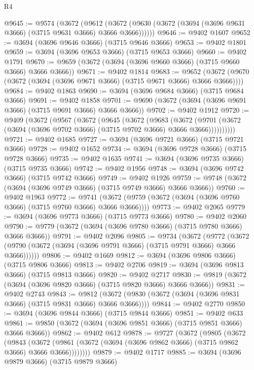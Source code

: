 \begin{lexlean}{R4}
\begin{coremodule}
@9645 := @9574
    (@3672
      (@9612 (@3672 (@9630 (@3672 (@3694 (@3696 @9631 @3666) (@3715 @9631 @3666) @3666 @3666))))))
@9646 := @9402 @1607
@9652 := @3694 (@3696 @9646 @3666) (@3715 @9646 @3666)
@9653 := @9402 @1801
@9659 := @3694 (@3696 @9653 @3666) (@3715 @9653 @3666)
@9660 := @9402 @1791
@9670 := @9659 (@3672 (@3694 (@3696 @9660 @3666) (@3715 @9660 @3666) @3666 @3666))
@9671 := @9402 @1814
@9683 := @9652 (@3672 (@9670 (@3672 (@3694 (@3696 @9671 @3666) (@3715 @9671 @3666) @3666 @3666))))
@9684 := @9402 @1863
@9690 := @3694 (@3696 @9684 @3666) (@3715 @9684 @3666)
@9691 := @9402 @1858
@9701 := @9690 (@3672 (@3694 (@3696 @9691 @3666) (@3715 @9691 @3666) @3666 @3666))
@9702 := @9402 @1912
@9720 := @9409
    (@3672
      (@9567
        (@3672
          (@9645
            (@3672
              (@9683
                (@3672
                  (@9701 (@3672 (@3694 (@3696 @9702 @3666) (@3715 @9702 @3666) @3666 @3666))))))))))
@9721 := @9402 @1685
@9727 := @3694 (@3696 @9721 @3666) (@3715 @9721 @3666)
@9728 := @9402 @1652
@9734 := @3694 (@3696 @9728 @3666) (@3715 @9728 @3666)
@9735 := @9402 @1635
@9741 := @3694 (@3696 @9735 @3666) (@3715 @9735 @3666)
@9742 := @9402 @1956
@9748 := @3694 (@3696 @9742 @3666) (@3715 @9742 @3666)
@9749 := @9402 @1926
@9759 := @9748 (@3672 (@3694 (@3696 @9749 @3666) (@3715 @9749 @3666) @3666 @3666))
@9760 := @9402 @1963
@9772 := @9741 (@3672 (@9759 (@3672 (@3694 (@3696 @9760 @3666) (@3715 @9760 @3666) @3666 @3666))))
@9773 := @9402 @2065
@9779 := @3694 (@3696 @9773 @3666) (@3715 @9773 @3666)
@9780 := @9402 @2060
@9790 := @9779 (@3672 (@3694 (@3696 @9780 @3666) (@3715 @9780 @3666) @3666 @3666))
@9791 := @9402 @2096
@9805 := @9734
    (@3672
      (@9772 (@3672 (@9790 (@3672 (@3694 (@3696 @9791 @3666) (@3715 @9791 @3666) @3666 @3666))))))
@9806 := @9402 @1669
@9812 := @3694 (@3696 @9806 @3666) (@3715 @9806 @3666)
@9813 := @9402 @2706
@9819 := @3694 (@3696 @9813 @3666) (@3715 @9813 @3666)
@9820 := @9402 @2717
@9830 := @9819 (@3672 (@3694 (@3696 @9820 @3666) (@3715 @9820 @3666) @3666 @3666))
@9831 := @9402 @2743
@9843 := @9812 (@3672 (@9830 (@3672 (@3694 (@3696 @9831 @3666) (@3715 @9831 @3666) @3666 @3666))))
@9844 := @9402 @2770
@9850 := @3694 (@3696 @9844 @3666) (@3715 @9844 @3666)
@9851 := @9402 @633
@9861 := @9850 (@3672 (@3694 (@3696 @9851 @3666) (@3715 @9851 @3666) @3666 @3666))
@9862 := @9402 @612
@9878 := @9727
    (@3672
      (@9805
        (@3672
          (@9843
            (@3672 (@9861 (@3672 (@3694 (@3696 @9862 @3666) (@3715 @9862 @3666) @3666 @3666))))))))
@9879 := @9402 @1717
@9885 := @3694 (@3696 @9879 @3666) (@3715 @9879 @3666)

\end{coremodule}
\end{lexlean}
